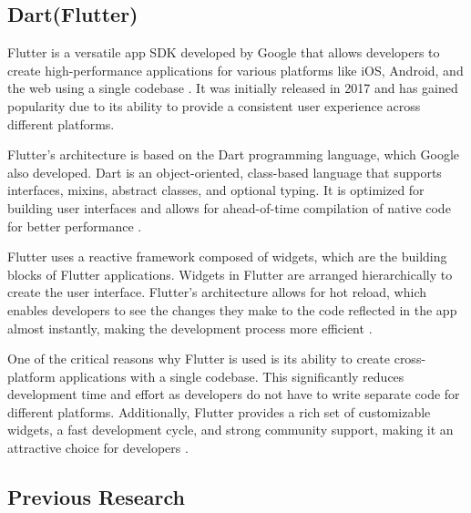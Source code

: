 \subsection{Dart(Flutter)}
Flutter is a versatile app SDK developed by Google that allows developers to create high-performance applications for various platforms like iOS, Android, and the web using a single codebase \cite{bouchemal2020scream}. It was initially released in 2017 and has gained popularity due to its ability to provide a consistent user experience across different platforms. 
\par
Flutter's architecture is based on the Dart programming language, which Google also developed. Dart is an object-oriented, class-based language that supports interfaces, mixins, abstract classes, and optional typing. It is optimized for building user interfaces and allows for ahead-of-time compilation of native code for better performance \cite{ernawati2021android}.
\par
Flutter uses a reactive framework composed of widgets, which are the building blocks of Flutter applications. Widgets in Flutter are arranged hierarchically to create the user interface. Flutter's architecture allows for hot reload, which enables developers to see the changes they make to the code reflected in the app almost instantly, making the development process more efficient \cite{pratama2021pengembangan}.
\par
One of the critical reasons why Flutter is used is its ability to create cross-platform applications with a single codebase. This significantly reduces development time and effort as developers do not have to write separate code for different platforms. Additionally, Flutter provides a rich set of customizable widgets, a fast development cycle, and strong community support, making it an attractive choice for developers \cite{pratama2021pengembangan}.
\subsection{Previous Research}

